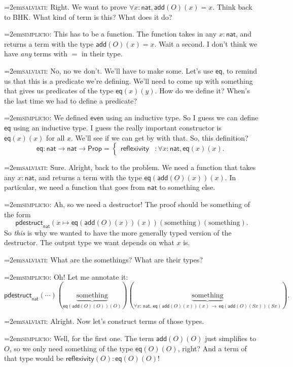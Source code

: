 \documentclass[11pt,paper=letter]{scrartcl}
\newcommand{\sf}{\mathsf}
\newcommand{\simp}{\vspace{0.5em}\noindent\hangindent=2em\textsc{simplicio:} }
\newcommand{\salv}{\vspace{0.5em}\noindent\hangindent=2em\textsc{salviati:} }
\newcommand{\prop}{\mathsf{Prop}}
\newcommand{\sto}{\,\to\,}
\begin{document}
\salv Right. We want to prove $\forall x: \sf{nat}, \sf{add}(O)(x) = x$. Think back to BHK. What kind of term is this? What does it do?

\simp This has to be a function. The function takes in any $x : \sf{nat}$, and returns a term with the type $\sf{add}(O)(x) = x$. Wait a second. I don't think we have \emph{any} terms with $=$ in their type.

\salv No, no we don't. We'll have to make some. Let's use $\sf{eq}$, to remind us that this is a predicate we're defining. We'll need to come up with something that gives us predicates of the type $\sf{eq}(x)(y)$. How do we define it? When's the last time we had to define a predicate?

\simp We defined $\sf{even}$ using an inductive type. So I guess we can define $\sf{eq}$ using an inductive type. I guess the really important constructor is $\sf{eq}(x)(x)$ for all $x$. We'll see if we can get by with that. So, this definition? \[
\sf{eq}: \sf{nat} \to \sf{nat} \to \prop =
  \begin{cases}
  \sf{reflexivity}&: \forall x: \sf{nat}, \sf{eq}(x)(x).
  \end{cases}
\]

\salv Sure. Alright, back to the problem. We need a function that takes any $x : \sf{nat}$, and returns a term with the type $\sf{eq}(\sf{add}(O)(x))(x)$. In particular, we need a function that goes from $\sf{nat}$ to something else.

\simp Ah, so we need a destructor! The proof should be something of the form \[
  \sf{pdestruct}_\sf{nat}(x \mapsto \sf{eq}(\sf{add}(O)(x))(x))
  (\text{something})(\text{something}).
\]
So \emph{this} is why we wanted to have the more generally typed version of the destructor. The output type we want depends on what $x$ is.

\salv What are the somethings? What are their types?

\simp Oh! Let me annotate it: \[
  \sf{pdestruct}_\sf{nat}
  (\cdots)
  (\underbrace{\text{something}}_{\sf{eq}(\sf{add}(O)(O))(O)})
  (\underbrace{\text{something}}_{\forall x:\,\sf{nat},\,\sf{eq}(\sf{add}(O)(x))(x)\sto\sf{eq}(\sf{add}(O)(Sx))(Sx)}).
\]

\salv Alright. Now let's construct terms of those types.

\simp Well, for the first one. The term $\sf{add}(O)(O)$ just simplifies to $O$, so we only need something of the type $\sf{eq}(O)(O)$, right? And a term of that type would be $\sf{reflexivity}(O) : \sf{eq}(O)(O)$!
\end{document}
